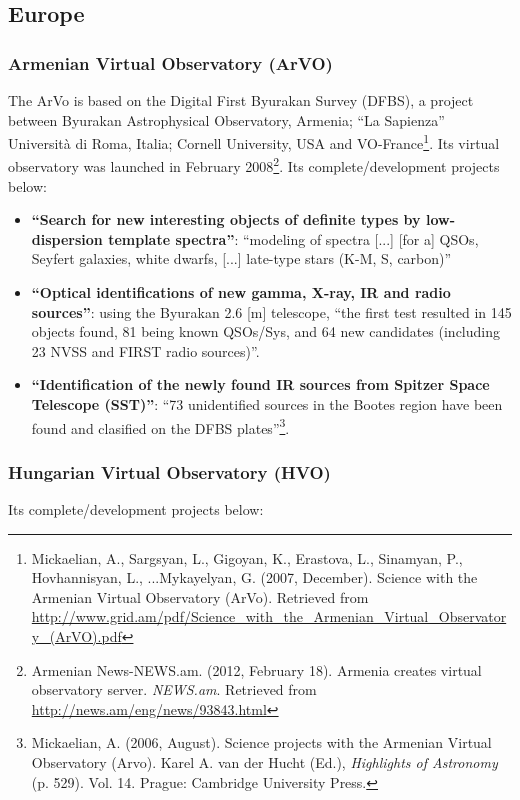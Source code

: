 \subsection{Europe}
\subsubsection{Armenian Virtual Observatory (ArVO)}
The ArVo \cite{website:arvo-home} is based on the Digital First Byurakan Survey
(DFBS), a project between Byurakan Astrophysical Observatory, Armenia; ``La
Sapienza'' Universit\`{a} di Roma, Italia; Cornell University, USA and
VO-France\footnote{Mickaelian, A., Sargsyan, L., Gigoyan, K., Erastova, L.,
Sinamyan, P., Hovhannisyan, L., ...Mykayelyan, G. (2007, December). Science with
the Armenian Virtual Observatory (ArVo).  Retrieved from
\url{http://www.grid.am/pdf/Science_with_the_Armenian_Virtual_Observatory_(ArVO).pdf}}.
Its virtual observatory was launched in February 2008\footnote{Armenian
News-NEWS.am. (2012, February 18). Armenia creates virtual observatory server.
\textit{NEWS.am}. Retrieved from \url{http://news.am/eng/news/93843.html}}. Its
complete/development projects below:

\begin{itemize}
\item \textbf{``Search for new interesting objects of definite types by
low-dispersion template spectra''}:
``modeling of spectra [...] [for a] QSOs, Seyfert galaxies, white dwarfs, [...]
late-type stars (K-M, S, carbon)'' 

\item \textbf{``Optical identifications of new gamma, X-ray, IR and radio
sources''}:
using the Byurakan 2.6 [m] telescope, ``the first test resulted in 145 objects
found, 81 being known QSOs/Sys, and 64 new candidates (including 23 NVSS and
FIRST radio sources)''.

\item \textbf{``Identification of the newly found IR sources from Spitzer Space
Telescope (SST)''}:
``73 unidentified sources in the Bootes region have been found and clasified on
the DFBS plates''\footnote{Mickaelian, A. (2006, August). Science projects with
the Armenian Virtual Observatory (Arvo). Karel A.  van der Hucht (Ed.),
\textit{Highlights of Astronomy} (p. 529). Vol. 14. Prague: Cambridge University
Press.}.
\end{itemize}

\subsubsection{Hungarian Virtual Observatory \cite{website:hvo-home} (HVO)}
Its complete/development projects below:

